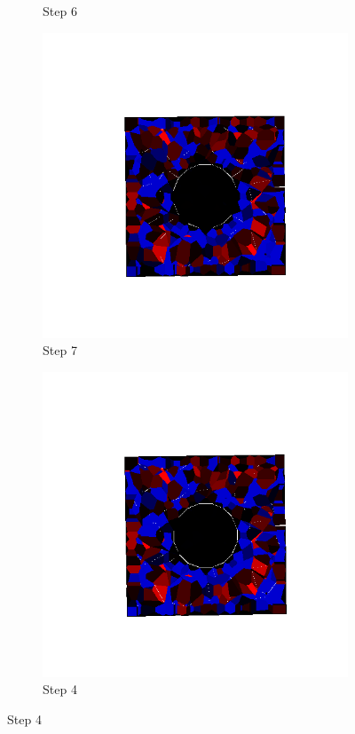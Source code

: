 \begin{figure}[ht!]
\begin{subfigure}{.25\textwidth}
      \caption{Step 6}
      \end{subfigure}%
      \begin{subfigure}{.25\textwidth}
        \centering
        \includegraphics[width=1.0\linewidth]{Files/Small_DEF/IS/DEP5-STEP(007).png}
      \caption{Step 7}
      \end{subfigure}%
      \begin{subfigure}{.25\textwidth}
        \centering
        \includegraphics[width=1.0\linewidth]{Files/Small_DEF/IS/DEP5-STEP(008).png}
      \caption{Step 4}
      \end{subfigure}


\end{figure}
